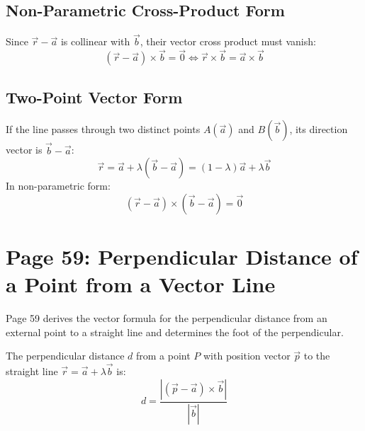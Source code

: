 \subsection{Non-Parametric Cross-Product Form}
Since $\vec{r} - \vec{a}$ is collinear with $\vec{b}$, their vector cross product must vanish:
\begin{equation}
    \boxed{(\vec{r} - \vec{a}) \times \vec{b} = \vec{0} \iff \vec{r} \times \vec{b} = \vec{a} \times \vec{b}}
\end{equation}

\subsection{Two-Point Vector Form}
If the line passes through two distinct points $A(\vec{a})$ and $B(\vec{b})$, its direction vector is $\vec{b} - \vec{a}$:
\begin{equation}
    \boxed{\vec{r} = \vec{a} + \lambda(\vec{b} - \vec{a}) = (1 - \lambda)\vec{a} + \lambda \vec{b}}
\end{equation}
In non-parametric form:
\begin{equation}
    \boxed{(\vec{r} - \vec{a}) \times (\vec{b} - \vec{a}) = \vec{0}}
\end{equation}

\section{Page 59: Perpendicular Distance of a Point from a Vector Line}
\label{sec:page59}

\begin{conceptbox}
Page 59 derives the vector formula for the perpendicular distance from an external point to a straight line and determines the foot of the perpendicular.
\end{conceptbox}

\begin{theorembox}
The perpendicular distance $d$ from a point $P$ with position vector $\vec{p}$ to the straight line $\vec{r} = \vec{a} + \lambda \vec{b}$ is:
\begin{equation}
    \boxed{d = \frac{|(\vec{p} - \vec{a}) \times \vec{b}|}{|\vec{b}|}}
\end{equation}
\end{theorembox}

